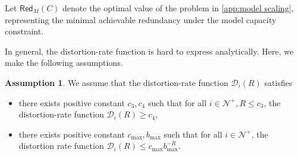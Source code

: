 \documentclass[11pt]{article}
\theoremstyle{plain}
\theoremstyle{definition}
\newtheorem{assumption}[theorem]{Assumption}
\newcommand{\knwModel}{\phi_{\text{knw}}}
\newcommand{\ratedistortion}{\mathcal{D}}
\newcommand{\testmodelerror}{\mathsf{Red}_M}
\newcommand{\jian}[1]{{\it \color{red}{Jian: #1}}}
\begin{document}
Let \( \testmodelerror(C) \) denote the optimal value of the problem in \eqref{app:model scaling}, representing the minimal achievable redundancy under the model capacity constraint.


In general, the distortion-rate function is hard to express analytically. 
 Here, we make the following assumptions.
 
\begin{assumption}
\label{appass:model scaling}
We assume that the distortion-rate function \( \ratedistortion_i(R) \) satisfies
\begin{itemize}
    \item there exists positive constant $c_3,c_4$ such that for all $i\in \mathcal{N}^+,R\le c_3$, the distortion-rate function $\ratedistortion_i(R)\ge c_4$,
    \item there exists positive constant $c_{\max},b_{\max}$ such that for all $i\in \mathcal{N}^+$, the distortion rate function $\ratedistortion_i(R) \le c_{\max} b_{\max}^{-R}.$
\end{itemize}
\end{assumption}









\end{document}
